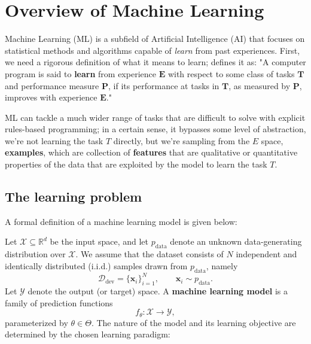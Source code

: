 \clearpage

\section{Overview of Machine Learning}
Machine Learning (ML) is a subfield of Artificial Intelligence (AI) that focuses on statistical methods and algorithms capable of \textit{learn} from past experiences.
First, we need a rigorous definition of what it means to learn; \textcite[]{mitchell1997machine} defines it as: "A computer program is said to \textbf{learn} from experience $\mathbf{E}$ with respect to 
some class of tasks $\mathbf{T}$ and performance measure $\mathbf{P}$, if its performance at tasks in $\mathbf{T}$, as measured by $\mathbf{P}$, improves with experience $\mathbf{E}$."

ML can tackle a much wider range of tasks that are difficult to solve with explicit rules-based programming; in a certain sense, it bypasses
some level of abstraction, we're not learning the task $T$ directly, but we're sampling from the $E$ space, \textbf{examples}, which are 
collection of \textbf{features} that are qualitative or quantitative properties of the data that are exploited by the model to learn the task $T$.
\subsection{The learning problem}
A formal definition of a machine learning model is given below:

\begin{definition}
Let $\mathcal{X} \subseteq \mathbb{R}^d$ be the input space, and let
$p_{\text{data}}$ denote an unknown data-generating distribution over $\mathcal{X}$.
We assume that the dataset consists of $N$ independent and identically distributed
(i.i.d.) samples drawn from $p_{\text{data}}$, namely
\[
\mathcal{D}_{\text{dev}} = \{\mathbf{x}_i\}_{i=1}^{N},
\qquad \mathbf{x}_i \sim p_{\text{data}}.
\]
Let $\mathcal{Y}$ denote the output (or target) space.
A \textbf{machine learning model} is a family of prediction functions
\[
f_\theta : \mathcal{X} \to \mathcal{Y},
\]
parameterized by $\theta \in \Theta$.
The nature of the model and its learning objective are determined by the
chosen learning paradigm:
\end{definition}

